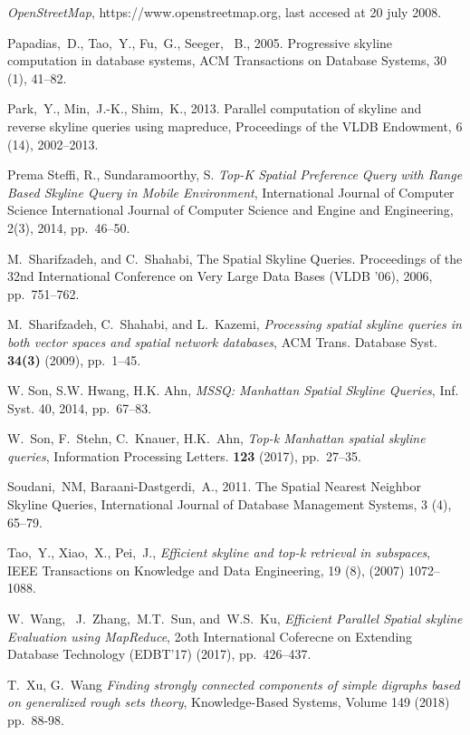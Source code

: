 \documentclass[11pt,onecolumn]{elsart3p}
\begin{document}
\begin{thebibliography}{100}
 \emph{OpenStreetMap}, https://www.openstreetmap.org, last accesed at 20 july 2008.

 Papadias,~D., Tao,~Y., Fu,~G., Seeger,~ B., 2005. Progressive skyline computation in
database systems, ACM Transactions on Database Systems, 30 (1), 41--82.

 Park,~Y., Min,~J.-K., Shim,~K., 2013. Parallel computation of skyline and reverse skyline
queries using mapreduce, Proceedings of the VLDB Endowment, 6 (14), 2002--2013.

 Prema Steffi, R., Sundaramoorthy, S. \emph{Top-K Spatial Preference Query
with Range Based Skyline Query in Mobile Environment}, International Journal
of Computer Science International Journal of Computer Science and Engine
and Engineering, 2(3), 2014, pp.~46--50.

 M.~Sharifzadeh, and C.~Shahabi, The Spatial Skyline Queries. Proceedings of the 32nd
International Conference on Very Large Data Bases (VLDB '06), 2006, pp.~751--762.

M.~Sharifzadeh, C.~Shahabi, and L.~Kazemi, \emph{Processing spatial skyline queries in both vector spaces and spatial network databases}, ACM Trans. Database Syst. \textbf{34(3)} (2009), pp.~1--45.

W. Son, S.W. Hwang, H.K. Ahn, \emph{MSSQ: Manhattan Spatial Skyline Queries}, Inf. Syst. 40, 2014, pp.~67--83.

 W.~Son, F.~Stehn, C.~Knauer, H.K.~Ahn, \emph{Top-k Manhattan spatial skyline queries},
Information Processing Letters.  \textbf{123} (2017),  pp.~27--35.

 Soudani,~NM, Baraani-Dastgerdi,~A., 2011. The Spatial Nearest Neighbor Skyline Queries,
International Journal of Database Management Systems, 3 (4), 65--79.

 Tao,~Y., Xiao,~X., Pei,~J., \emph{Efficient skyline and top-k retrieval in subspaces}, IEEE Transactions on Knowledge and Data Engineering, 19 (8), (2007) 1072--1088.

 W.~Wang, ~J.~Zhang,~M.T.~Sun, and~W.S.~Ku, \emph{Efficient Parallel Spatial skyline
Evaluation using MapReduce}, 2oth International Coferecne on Extending Database Technology (EDBT'17) (2017), pp.~426--437.

T.~Xu, G.~Wang
\emph{Finding strongly connected components of simple digraphs based on generalized rough sets theory},
Knowledge-Based Systems, Volume 149 (2018) pp.~88-98.


\end{thebibliography}
\end{document}
